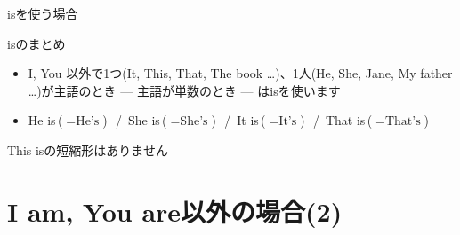 \documentclass[aspectratio=169,xcolor={dvipsnames,table}]{beamer}
\begin{document}
\begin{frame}[plain]{isを使う場合}

\begin{block}{isのまとめ}
\begin{itemize}
 \item I, You 以外で1つ(It, This, That, The book \ldots{})、1人(He, She, Jane, My father \ldots{})が主語のとき\,\,---\,\,主語が単数のとき\,\,---\,\,はisを使います
 \item He is\,($=\text{He's}$)\,\,\,\,/\,\,\,She is\,($=\text{She's}$)\,\,\,\,/\,\,\,It is\,($=\text{It's}$)\,\,\,\,/\,\,\,That is\,($=\text{That's}$)
\end{itemize}  
     \end{block}

\mbox{}\hfill{}This isの短縮形はありません

\end{frame}
\section{I am, You are以外の場合(2)}
\end{document}
